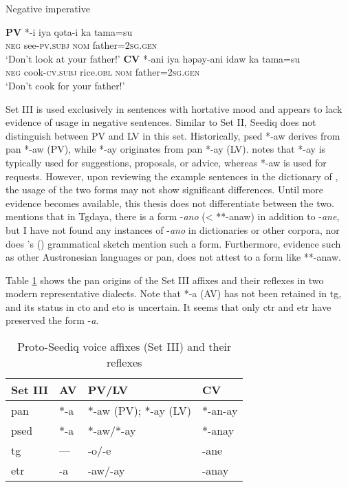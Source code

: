 \begin{exe}
\ex Negative imperative \label{ex:SetII_3}
    \begin{xlist}
    \ex \textbf{PV} *-i
    \gll *iya qəta-i ka tama=su\\
    \textsc{neg} see-\textsc{pv.subj} \textsc{nom} father=\textsc{2sg.gen}\\
    \glt `Don't look at your father!'
    \ex \textbf{CV} *-ani
    \gll *iya həpəy-ani idaw ka tama=su\\
    \textsc{neg} cook-\textsc{cv.subj} rice.\textsc{obl} \textsc{nom} father=\textsc{2sg.gen}\\
    \glt `Don't cook for your father!'
    \end{xlist}
\end{exe}

Set III is used exclusively in sentences with hortative mood and appears to lack evidence of usage in negative sentences. Similar to Set II, Seediq does not distinguish between PV and LV in this set. Historically, \acl{psed} *-aw derives from \acl{pan} *-aw (PV), while *-ay originates from \acl{pan} *-ay (LV). \textcite[103]{Lee2018Trugrammar} notes that *-ay is typically used for suggestions, proposals, or advice, whereas *-aw is used for requests. However, upon reviewing the example sentences in the dictionary of \textcite{ILRDFEdict}, the usage of the two forms may not show significant differences. Until more evidence becomes available, this thesis does not differentiate between the two. \textcite[97]{Sung2018Sedgrammar} mentions that in Tgdaya, there is a form -\textit{ano} (< **-anaw) in addition to -\textit{ane}, but I have not found any instances of -\textit{ano} in dictionaries or other corpora, nor does \citeauthor{ochiai2016phd}'s (\citeyear{ochiai2016phd}) grammatical sketch mention such a form. Furthermore, evidence such as other Austronesian languages or \acl{pan}, does not attest to a form like **-anaw.

Table \ref{tab:psed_voi_III} shows the \acl{pan} origins of the Set III affixes and their reflexes in two modern representative dialects. Note that *-a (AV) has not been retained in \acl{tg}, and its status in \acl{cto} and \acl{eto} is uncertain. It seems that only \acl{ctr} and \acl{etr} have preserved the form -\textit{a}.

\begin{table}[!htbp]
\centering
\caption{Proto-Seediq voice affixes (Set III) and their reflexes}
\label{tab:psed_voi_III}
\begin{tabular}{llll}
\hline
Set III   & AV  & PV/LV                & CV      \\ \hline
\ac{pan}  & *-a & *-aw (PV); *-ay (LV) & *-an-ay \\
\ac{psed} & *-a & *-aw/*-ay            & *-anay  \\
\ac{tg}   & --- & -o/-e                & -ane    \\
\ac{etr}  & -a  & -aw/-ay              & -anay   \\ \hline
\end{tabular}
\end{table}

